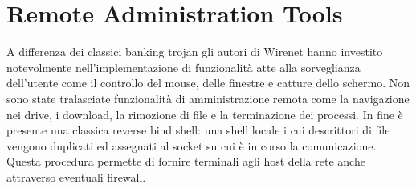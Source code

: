 \documentclass[12pt,oneside]{fithesis2}
\begin{document}
        \section*{Remote Administration Tools}
        A differenza dei classici banking trojan gli autori di Wirenet hanno investito notevolmente nell'implementazione di funzionalità atte alla sorveglianza dell'utente come il controllo del mouse, delle finestre e catture dello schermo. Non sono state tralasciate funzionalità di amministrazione remota come la navigazione nei drive, i download, la rimozione di file e la terminazione dei processi. %
        In fine è presente una classica reverse bind shell: una shell locale i cui descrittori di file vengono duplicati ed assegnati al socket su cui è in corso la comunicazione. Questa procedura permette di fornire terminali agli host della rete anche attraverso eventuali firewall.
        \begin{center}
        \end{center}
        \clearpage
\end{document}
